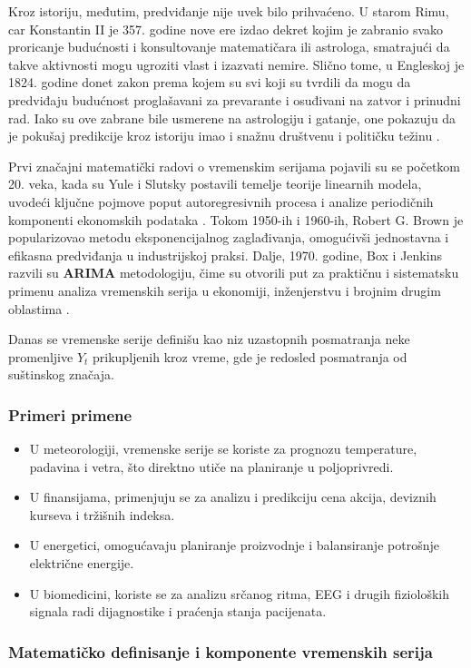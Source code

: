 \documentclass[12pt]{article}
\begin{document}
Kroz istoriju, međutim, predviđanje nije uvek bilo prihvaćeno. U starom Rimu, car Konstantin II je 357. godine nove ere izdao dekret kojim je zabranio svako proricanje budućnosti i konsultovanje matematičara ili astrologa, smatrajući da takve aktivnosti mogu ugroziti vlast i izazvati nemire. Slično tome, u Engleskoj je 1824. godine donet zakon prema kojem su svi koji su tvrdili da mogu da predviđaju budućnost proglašavani za prevarante i osuđivani na zatvor i prinudni rad. Iako su ove zabrane bile usmerene na astrologiju i gatanje, one pokazuju da je pokušaj predikcije kroz istoriju imao i snažnu društvenu i političku težinu \cite{histlaw2025}.

Prvi značajni matematički radovi o vremenskim serijama pojavili su se početkom 20. veka, kada su Yule i Slutsky postavili temelje teorije linearnih modela, uvodeći ključne pojmove poput autoregresivnih procesa i analize periodičnih komponenti ekonomskih podataka \cite{yule1927, slutsky1937}. Tokom 1950-ih i 1960-ih, Robert G. Brown je popularizovao metodu eksponencijalnog zaglađivanja, omogućivši jednostavna i efikasna predviđanja u industrijskoj praksi. Dalje, 1970. godine, Box i Jenkins razvili su \textbf{ARIMA} metodologiju, čime su otvorili put za praktičnu i sistematsku primenu analiza vremenskih serija u ekonomiji, inženjerstvu i brojnim drugim oblastima \cite{box1970}.

Danas se vremenske serije definišu kao niz uzastopnih posmatranja neke promenljive ${Y_t}$ prikupljenih kroz vreme, gde je redosled posmatranja od suštinskog značaja.

\subsubsection{Primeri primene}
\begin{itemize}
    \item U meteorologiji, vremenske serije se koriste za prognozu temperature, padavina i vetra, što direktno utiče na planiranje u poljoprivredi.
    \item U finansijama, primenjuju se za analizu i predikciju cena akcija, deviznih kurseva i tržišnih indeksa.
    \item U energetici, omogućavaju planiranje proizvodnje i balansiranje potrošnje električne energije.
    \item U biomedicini, koriste se za analizu srčanog ritma, EEG i drugih fizioloških signala radi dijagnostike i praćenja stanja pacijenata.
\end{itemize}
\subsubsection{Matematičko definisanje i komponente vremenskih serija}
\end{document}
